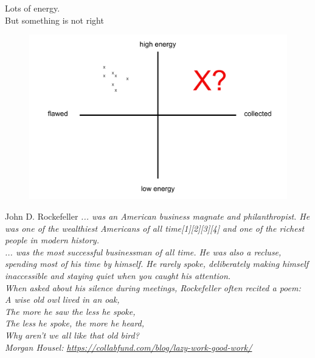 \documentclass{simple}
\begin{document}
\begin{frame}{}
  \centering
  \pause Lots of energy. \\
  \vspace{3mm}
  \pause But something is not right
\end{frame}

\begin{frame}{}
  \begin{figure}
    \centering
    \includegraphics[width=\textwidth]{img/flawed-energy}
  \end{figure}
\end{frame}

\begin{frame}{John D. Rockefeller}
  \centering
  \pause \textit{... was an American business magnate and philanthropist. He was one of the wealthiest Americans of all time[1][2][3][4] and one of the richest people in modern history.}\\
  \vspace{3mm}
  \pause \textit{... was the most successful businessman of all time. He was also a recluse, spending most of his time by himself. He rarely spoke, deliberately making himself inaccessible and staying quiet when you caught his attention.}\\
  \vspace{3mm}
  \pause \textit{ When asked about his silence during meetings, Rockefeller often recited a poem:\\
  A wise old owl lived in an oak,\\
  The more he saw the less he spoke,\\
  The less he spoke, the more he heard,\\
  Why aren't we all like that old bird?}\\
  \hfill \textit{Morgan Housel: \url{https://collabfund.com/blog/lazy-work-good-work/}}
\end{frame}
\end{document}
